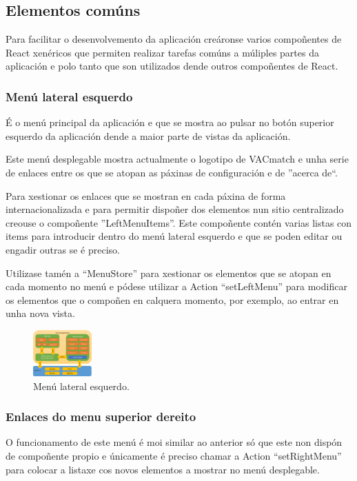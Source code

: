     \subsection{Elementos comúns}
    Para facilitar o desenvolvemento da aplicación creáronse varios 
compoñentes de React xenéricos que permiten realizar tarefas comúns a múliples 
partes da aplicación e polo tanto que son utilizados dende outros compoñentes 
de React.

      \subsubsection{Menú lateral esquerdo}
      É o menú principal da aplicación e que se mostra ao pulsar no botón 
superior esquerdo da aplicación dende a maior parte de vistas da aplicación.

      Este menú desplegable mostra actualmente o logotipo de VACmatch e unha 
serie de enlaces entre os que se atopan as páxinas de configuración e de 
''acerca de``.

      Para xestionar os enlaces que se mostran en cada páxina de forma 
internacionalizada e para permitir dispoñer dos elementos nun sitio 
centralizado creouse o compoñente ''LeftMenuItems''.
      Este compoñente contén varias listas con items para introducir dentro do 
menú lateral esquerdo e que se poden editar ou engadir outras se é 
preciso.

      Utilizase tamén a ``MenuStore'' para xestionar os elementos que se atopan 
en cada momento no menú e pódese utilizar a Action ``setLeftMenu'' para 
modificar os elementos que o compoñen en calquera momento, por exemplo, ao 
entrar en unha nova vista.

      \begin{figure}[h!]
        \begin{center}
        \includegraphics[width=0.2\textwidth]{./img/cordova_arquitectura.png}
        \caption{Menú lateral esquerdo.}
        \end{center}
      \end{figure}

      \subsubsection{Enlaces do menu superior dereito}
      O funcionamento de este menú é moi similar ao anterior só que este 
non dispón de compoñente propio e únicamente é preciso chamar a Action 
``setRightMenu'' para colocar a listaxe cos novos elementos a mostrar no menú 
desplegable.


